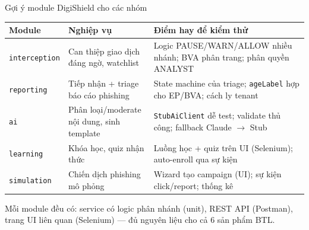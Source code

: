 \documentclass[aspectratio=169,12pt]{beamer}
\begin{document}
\begin{frame}{Gợi ý module DigiShield cho các nhóm}
  \begin{center}
  \scriptsize
  \setlength{\tabcolsep}{3.5pt}
  \renewcommand{\arraystretch}{1.12}
  \begin{tabular}{>{\raggedright\arraybackslash}p{2.1cm}>{\raggedright\arraybackslash}p{4.6cm}>{\raggedright\arraybackslash}p{5.2cm}}
    \toprule
    \textbf{Module} & \textbf{Nghiệp vụ} & \textbf{Điểm hay để kiểm thử} \\
    \midrule
    \texttt{interception} & Can thiệp giao dịch đáng ngờ, watchlist &
      Logic PAUSE/WARN/ALLOW nhiều nhánh; BVA phân trang; phân quyền ANALYST \\
    \texttt{reporting} & Tiếp nhận + triage báo cáo phishing &
      State machine của triage; \texttt{ageLabel} hợp cho EP/BVA; cách ly tenant \\
    \texttt{ai} & Phân loại/moderate nội dung, sinh template &
      \texttt{StubAiClient} dễ test; validate thủ công; fallback Claude $\to$ Stub \\
    \texttt{learning} & Khóa học, quiz nhận thức &
      Luồng học + quiz trên UI (Selenium); auto-enroll qua sự kiện \\
    \texttt{simulation} & Chiến dịch phishing mô phỏng &
      Wizard tạo campaign (UI); sự kiện click/report; thống kê \\
    \bottomrule
  \end{tabular}
  \end{center}

  \vspace{0.3em}
  \small Mỗi module đều có: service có logic phân nhánh (unit), REST API (Postman),
  trang UI liên quan (Selenium) --- đủ nguyên liệu cho cả 6 sản phẩm BTL.
\end{frame}
\end{document}
